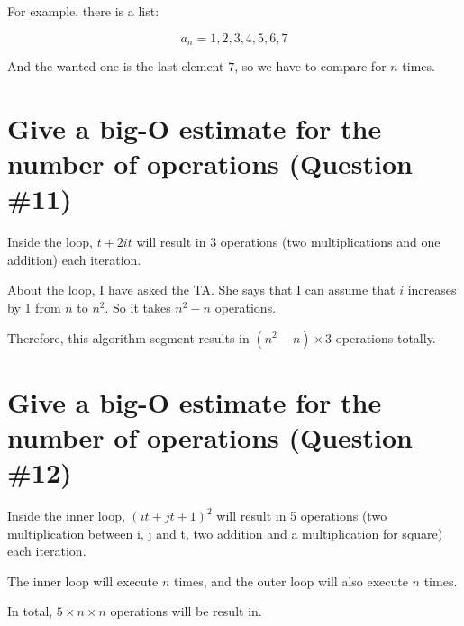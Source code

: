 \documentclass[12pt]{article}
\begin{document}
For example, there is a list:

$${a_n} = {1, 2, 3, 4, 5, 6, 7}$$

And the wanted one is the last element $7$, so we have to compare for $n$ times.

\section{Give a big-O estimate for the number of operations (Question \#11)}

Inside the loop, $t + 2it$ will result in 3 operations (two multiplications and one addition) each iteration.

About the loop, I have asked the TA. She says that I can assume that $i$ increases by 1 from $n$ to $n^2$. So it takes $n^2 - n$ operations.

Therefore, this algorithm segment results in $(n^2 - n) \times 3$ operations totally.

\section{Give a big-O estimate for the number of operations (Question \#12)}

Inside the inner loop, $(it + jt + 1)^2$ will result in 5 operations (two multiplication between i, j and t, two addition and a multiplication for square) each iteration.

The inner loop will execute $n$ times, and the outer loop will also execute $n$ times.

In total, $5 \times n \times n$ operations will be result in.
\end{document}
